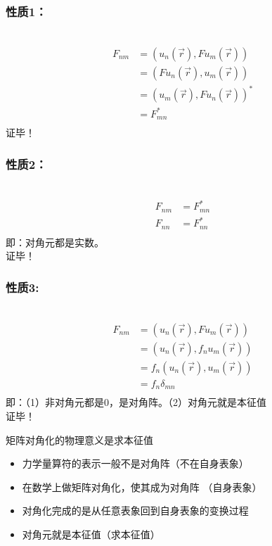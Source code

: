 \begin{frame}
    \frametitle{性质1：}
    \例[6.试证明力学量算符的矩阵表示都是厄密矩阵]{}
    \证~ 
    \begin{equation*}
        \begin{split}
            F_{nm}&=(u_n (\vec{r}), Fu_m(\vec{r}))\\
            &=(Fu_n (\vec{r}), u_m(\vec{r}))\\
            &=(u_m(\vec{r}), Fu_n (\vec{r}))^*\\
            &=F_{mn}^*\\
        \end{split} 
    \end{equation*}
    证毕！
\end{frame}

\begin{frame}
    \frametitle{性质2：}
    \证~ 
    \begin{equation*}
        \begin{split}
            F_{nm}&=F_{mn}^*\\
            F_{nn}&=F_{nn}^*\\
        \end{split} 
    \end{equation*}
    即：对角元都是实数。 \\
    证毕！
\end{frame}

\begin{frame}
    \frametitle{性质3:}
    \证~ 
    \begin{equation*}
        \begin{split}
            F_{nm}&=(u_n (\vec{r}), Fu_m(\vec{r}))\\
            &=(u_n (\vec{r}), f_nu_m(\vec{r}))\\
            &=f_n(u_n (\vec{r}), u_m(\vec{r}))\\
            &=f_n\delta_{mn}\\
        \end{split} 
    \end{equation*}
    即：（1）非对角元都是0，是对角阵。（2）对角元就是本征值\\
    证毕！
\end{frame}

\begin{frame} [allowframebreaks=]
    \begin{tcolorbox2}{矩阵对角化的物理意义是求本征值}
        \begin{itemize}
            \item 力学量算符的表示一般不是对角阵（不在自身表象）
            \item 在数学上做矩阵对角化，使其成为对角阵 （自身表象）
            \item 对角化完成的是从任意表象回到自身表象的变换过程
            \item 对角元就是本征值（求本征值）
        \end{itemize}  
    \end{tcolorbox2}
\end{frame}


